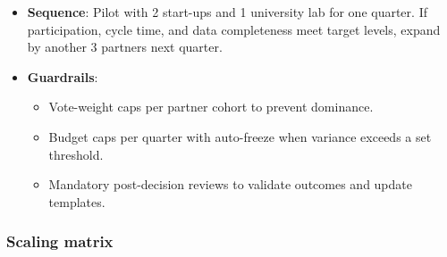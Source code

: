 \documentclass[
  english,
  12pt,
  oneside,
  open=any]{scrbook}
\providecommand{\tightlist}{%
  \setlength{\itemsep}{0pt}\setlength{\parskip}{0pt}}\usepackage{longtable,booktabs,array}
\begin{document}
\begin{itemize}
\tightlist
\item
  \textbf{Sequence}: Pilot with 2 start-ups and 1 university lab for one
  quarter. If participation, cycle time, and data completeness meet
  target levels, expand by another 3 partners next quarter.
\item
  \textbf{Guardrails}:

  \begin{itemize}
  \tightlist
  \item
    Vote-weight caps per partner cohort to prevent dominance.\\
  \item
    Budget caps per quarter with auto-freeze when variance exceeds a set
    threshold.\\
  \item
    Mandatory post-decision reviews to validate outcomes and update
    templates.
  \end{itemize}
\end{itemize}

\subsubsection{Scaling matrix}\label{scaling-matrix}
\end{document}
